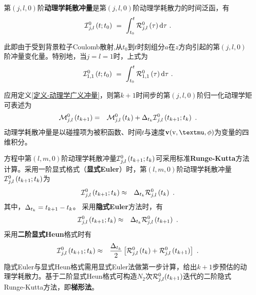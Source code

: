 \begin{definition} \label{定义-动理学广义冲量}
    第$(j,l,0)$阶\textbf{动理学耗散冲量}是第$(j,l,0)$阶动理学耗散力的时间泛函，有
    \begin{equation}
        \calIjlo \left(t;t_0 \right) \ = \ \int_{t_0}^t \calRjlo \left(\tau \right) \rmd \tau ~. \label{IRjl}
    \end{equation}
   \end{definition}
\noindent
此即由于受到背景粒子Coulomb散射,从$t_0$到$t$时刻组分$a$在$z$方向引起的第$(j,l,0)$阶冲量变化量。特别地，当$j=l=1$时，上式为
      \begin{equation}
        \calI_{1,1}^0 \left(t;t_0 \right) \ = \ \int_{t_0}^t \calR_{1,1}^0 \left(\tau \right) \rmd \tau ~. \label{IR110}
      \end{equation}

应用定义\ref{定义-动理学广义冲量}，则第$k+1$时间步的第$(j,l,0)$阶归一化动理学矩可表述为
  \begin{eqnarray}
      {\mathcal{M}}{_{j,l}^0} \left(t_{k+1} \right) & = & {\mathcal{M}}{_{j,l}^0} \left(t_k \right) +  {\Delta}_{t_k}  {\mathcal{I}}{_{j,l}^0} \left(t_{k+1}; t_k \right) ~. \label{Mjlmk1}
  \end{eqnarray}
  动理学耗散冲量是以碰撞项为被积函数、时间$t$与速度$\v(\rmv,\mu,\phi)$为变量的四维积分。
  
  方程中第$(l,m,0)$阶动理学耗散冲量${\mathcal{I}}{_{j,l}^0} \left(t_{k+1}; t_k \right)$可采用标准\textbf{Runge-Kutta}方法计算。采用一阶显式格式（\textbf{显式Euler}）时，第$(l,m,0)$阶动理学耗散冲量${\mathcal{I}}{_{j,l}^0} \left(t_{k+1}; t_k \right)$为
  \begin{eqnarray}
      {\mathcal{I}}{_{j,l}^0} \left(t_{k+1}; t_k \right) &\approx& {\Delta}_{t_k} {\mathcal{R}}_{j,l}^{0} \left(t_k \right) ~. \label{Ijlokk1RK1exM}
  \end{eqnarray}
  其中，${\Delta}_{t_k}=t_{k+1}-t_k$。
  采用\textbf{隐式Euler}方法时，有
  \begin{eqnarray}
      {\mathcal{I}}{_{j,l}^0} \left(t_{k+1}; t_k \right) &\approx& {\Delta}_{t_k} {\mathcal{R}}_{j,l}^{0} \left(t_{k+1} \right) ~. \label{Ijlokk1RK1imM}
  \end{eqnarray}
  采用\textbf{二阶显式Heun}格式时有
  \begin{eqnarray}
      {\mathcal{I}}{_{j,l}^0} \left(t_{k+1}; t_k \right) &\approx& \frac{{\Delta}_{t_k}}{2} \left[{\mathcal{R}}_{j,l}^{0} \left(t_k \right) + {\mathcal{R}}_{j,l}^{0} \left(t_{k+1} \right)\right] ~. \label{Ijlokk1RK2exM}
  \end{eqnarray}
  隐式Euler与显式Heun格式需用显式Euler法做第一步计算，给出$k+1$步预估的动理学耗散力。基于二阶显式Heun格式可构造$N_2$次${\mathcal{R}}_{j,l}^{0}(t_{k+1})$迭代的二阶隐式Runge-Kutta方法，即\textbf{梯形法}。

